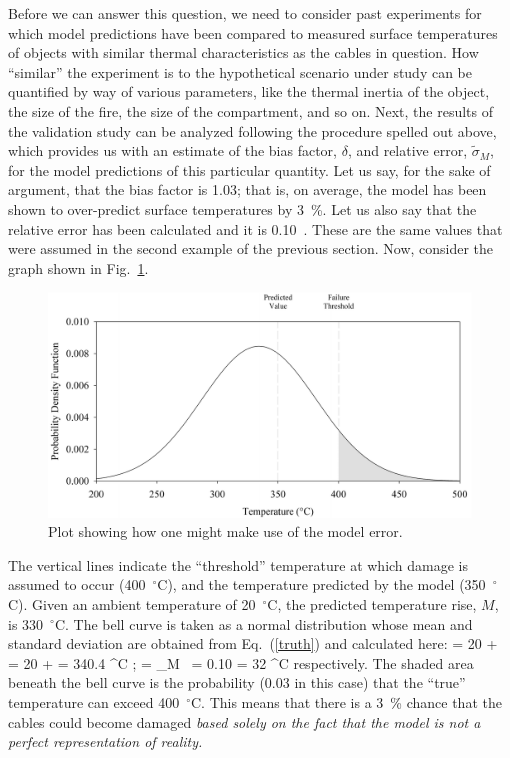Before we can answer this question, we need to consider past experiments for which model predictions have been compared to measured surface temperatures of objects
with similar thermal characteristics as the cables in question. How ``similar'' the experiment is to the hypothetical scenario under study can be quantified by way of
various parameters, like the thermal inertia of the object, the size of the fire, the size of the compartment, and so on. Next, the results of the validation study can be
analyzed following the procedure spelled out above, which provides us with an estimate of the bias factor, $\delta$, and relative error, $\tilde{\sigma}_M$, for the model
predictions of this particular quantity. Let us say, for the sake of argument, that the bias factor is 1.03; that is, on average, the model has been shown to over-predict
surface temperatures by 3~\%. Let us also say that the relative error has been calculated and it is 0.10~. These are the same values that were assumed in the second example
of the previous section.
Now, consider the graph shown in Fig.~\ref{bell_curve}.
\begin{figure}[t]
\begin{center}
\includegraphics[width=5.in]{FIGURES/bell_curve}
\end{center}
\caption[Demonstration of model error.]{Plot showing how one might make use of the model error.}
\label{bell_curve}
\end{figure}
The vertical lines indicate the ``threshold'' temperature at which damage is assumed to occur (400~$^\circ$C), and the temperature predicted by the
model (350~$^\circ$C). Given an ambient temperature of 20~$^\circ$C, the predicted temperature rise, $M$, is 330~$^\circ$C.
The bell curve is taken as a normal distribution whose mean and standard deviation are obtained from Eq.~(\ref{truth}) and calculated here:
\be \mu = 20 +  = 20 +  = 340.4 \; ^\circ \hbox{C}  \quad ; \quad  
   \sigma = \widetilde{\sigma}_M \,  = 0.10 \times {} = 32 \; ^\circ \hbox{C}  \ee
respectively. The shaded area beneath the bell curve is the probability (0.03 in this case) that the ``true'' temperature can exceed 400~$^\circ$C.
This means that there is a 3~\% chance that the cables could
become damaged {\em based solely on the fact that the model is not a perfect representation of reality.}

